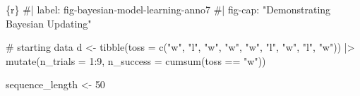 \documentclass[
  letterpaper,
  DIV=11,
  numbers=noendperiod]{scrreprt}
\newenvironment{Shaded}{\begin{snugshade}}{\end{snugshade}}
\newcommand{\AttributeTok}[1]{\textcolor[rgb]{0.40,0.45,0.13}{#1}}
\newcommand{\CommentTok}[1]{\textcolor[rgb]{0.37,0.37,0.37}{#1}}
\newcommand{\DecValTok}[1]{\textcolor[rgb]{0.68,0.00,0.00}{#1}}
\newcommand{\FunctionTok}[1]{\textcolor[rgb]{0.28,0.35,0.67}{#1}}
\newcommand{\InformationTok}[1]{\textcolor[rgb]{0.37,0.37,0.37}{#1}}
\newcommand{\NormalTok}[1]{\textcolor[rgb]{0.00,0.23,0.31}{#1}}
\newcommand{\OtherTok}[1]{\textcolor[rgb]{0.00,0.23,0.31}{#1}}
\newcommand{\SpecialCharTok}[1]{\textcolor[rgb]{0.37,0.37,0.37}{#1}}
\newcommand{\StringTok}[1]{\textcolor[rgb]{0.13,0.47,0.30}{#1}}
\begin{document}
\hypertarget{annotated-cell-34}{%
\label{annotated-cell-34}}%
\begin{Shaded}
\begin{Highlighting}[]
\InformationTok{\textasciigrave{}\textasciigrave{}\textasciigrave{}\{r\}}
\CommentTok{\#| label: fig{-}bayesian{-}model{-}learning{-}anno7}
\CommentTok{\#| fig{-}cap: "Demonstrating Bayesian Updating"}

\CommentTok{\# starting data}
\NormalTok{d }\OtherTok{\textless{}{-}} \FunctionTok{tibble}\NormalTok{(}\AttributeTok{toss =} \FunctionTok{c}\NormalTok{(}\StringTok{"w"}\NormalTok{, }\StringTok{"l"}\NormalTok{, }\StringTok{"w"}\NormalTok{, }\StringTok{"w"}\NormalTok{, }\StringTok{"w"}\NormalTok{, }\StringTok{"l"}\NormalTok{, }\StringTok{"w"}\NormalTok{, }\StringTok{"l"}\NormalTok{, }\StringTok{"w"}\NormalTok{)) }\SpecialCharTok{|\textgreater{}} 
    \FunctionTok{mutate}\NormalTok{(}\AttributeTok{n\_trials  =} \DecValTok{1}\SpecialCharTok{:}\DecValTok{9}\NormalTok{, }\AttributeTok{n\_success =} \FunctionTok{cumsum}\NormalTok{(toss }\SpecialCharTok{==} \StringTok{"w"}\NormalTok{))}

\NormalTok{sequence\_length }\OtherTok{\textless{}{-}} \DecValTok{50}


\end{Highlighting}
\end{Shaded}
\end{document}
